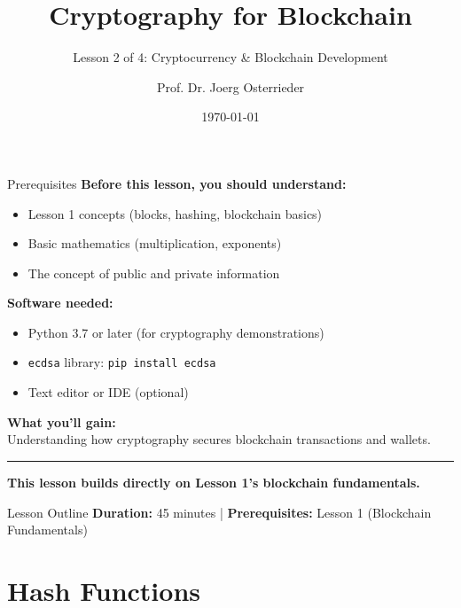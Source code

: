 \documentclass[8pt,aspectratio=169]{beamer}
\title{Cryptography for Blockchain}
\subtitle{Lesson 2 of 4: Cryptocurrency \& Blockchain Development}
\author{Prof. Dr. Joerg Osterrieder}
\institute{University Lecture Series}
\date{\today}
\newcommand{\bottomnote}[1]{%
\vfill
\vspace{-2mm}
\textcolor{mllavender2}{\rule{\textwidth}{0.4pt}}
\vspace{1mm}
\footnotesize
\textbf{#1}
}
\begin{document}
\begin{frame}[plain]
\titlepage
\end{frame}

\begin{frame}{Prerequisites}
\textbf{Before this lesson, you should understand:}
\begin{itemize}
\item Lesson 1 concepts (blocks, hashing, blockchain basics)
\item Basic mathematics (multiplication, exponents)
\item The concept of public and private information
\end{itemize}

\vspace{1em}
\textbf{Software needed:}
\begin{itemize}
\item Python 3.7 or later (for cryptography demonstrations)
\item \texttt{ecdsa} library: \texttt{pip install ecdsa}
\item Text editor or IDE (optional)
\end{itemize}

\vspace{1em}
\textbf{What you'll gain:}\\
Understanding how cryptography secures blockchain transactions and wallets.

\bottomnote{This lesson builds directly on Lesson 1's blockchain fundamentals.}
\end{frame}

\begin{frame}[t]{Lesson Outline}
\tableofcontents
\vfill
\footnotesize
\textbf{Duration:} 45 minutes | \textbf{Prerequisites:} Lesson 1 (Blockchain Fundamentals)
\end{frame}

\section{Hash Functions}
\end{document}
